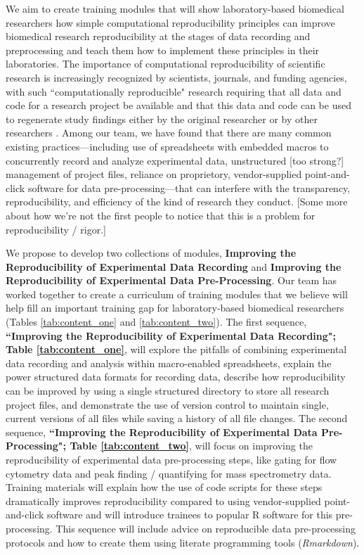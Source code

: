 \documentclass[pdftex,english,11pt,parskip=half]{scrartcl}
\begin{document}
We aim to create training modules that will show laboratory-based biomedical researchers how simple computational reproducibility principles can improve biomedical research reproducibility at the stages of data recording and preprocessing and teach them how to implement these principles in their laboratories. The importance of computational reproducibility of scientific research is increasingly recognized by scientists, journals, and funding agencies, with such ``computationally reproducible" research requiring that all data and code for a research project be available and that this data and code can be used to regenerate study findings either by the original researcher or by other researchers \cite{ellis2017share, ram2013git}. Among our team, we have found that there are many common existing practices---including use of spreadsheets with embedded macros to concurrently record and analyze experimental data, unstructured [too strong?] management of project files, reliance on proprietory, vendor-supplied point-and-click software for data pre-processing---that can interfere with the transparency, reproducibility, and efficiency of the kind of research they conduct. [Some more about how we're not the first people to notice that this is a problem for reproducibility / rigor.] 

We propose to develop two collections of modules, \textbf{Improving the Reproducibility of Experimental Data Recording} and \textbf{Improving the Reproducibility of Experimental Data Pre-Processing}. Our team has worked together to create a curriculum of training modules that we believe will help fill an important training gap for laboratory-based biomedical researchers (Tables \ref{tab:content_one} and \ref{tab:content_two}). The first sequence, \textbf{``Improving the Reproducibility of Experimental Data Recording"; Table \ref{tab:content_one}}, will explore the pitfalls of combining experimental data recording and analysis within macro-enabled spreadsheets, explain the power structured data formats for recording data, describe how reproducibility can be improved by using a single structured directory to store all research project files, and demonstrate the use of version control to maintain single, current versions of all files while saving a history of all file changes. The second sequence, \textbf{``Improving the Reproducibility of Experimental Data Pre-Processing"; Table \ref{tab:content_two}}, will focus on improving the reproducibility of experimental data pre-processing steps, like gating for flow cytometry data and peak finding / quantifying for mass spectrometry data. Training materials will explain how the use of code scripts for these steps dramatically improves reproducibility compared to using vendor-supplied point-and-click software and will introduce trainees to popular R software for this pre-processing. This sequence will include advice on reproducible data pre-processing protocols and how to create them using literate programming tools (\textit{Rmarkdown}).
\end{document}
